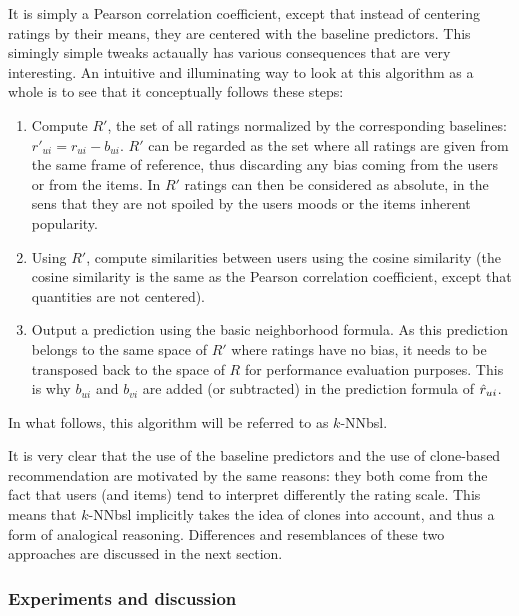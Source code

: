 It is simply a Pearson correlation coefficient, except that instead of
centering ratings by their means, they are centered with the baseline
predictors. This simingly simple tweaks actaually has various consequences that
are very interesting. An intuitive and illuminating way to look at this
algorithm as a whole is to see that it conceptually follows these steps:
\begin{enumerate}
  \item Compute $R'$, the set of all ratings normalized by the corresponding
    baselines: $r'_{ui} = r_{ui} - b_{ui}$.  $R'$ can be regarded as the set
    where all ratings are given from the same frame of reference, thus
    discarding any bias coming from the users or from the items. In $R'$
    ratings can then be considered as absolute, in the sens that they are not
    spoiled by the users moods or the items inherent popularity.
  \item Using $R'$, compute similarities between users using the cosine
    similarity (the cosine similarity is the same as the Pearson correlation
    coefficient, except that quantities are not centered).
  \item Output a prediction using the basic neighborhood formula. As this
    prediction belongs to the same space of $R'$ where ratings have no bias, it
    needs to be transposed back to the space of $R$ for performance evaluation
    purposes. This is why $b_{ui}$ and $b_{vi}$ are added (or subtracted) in
    the prediction formula of $\hat{r}_{ui}$.
\end{enumerate}

In what follows, this algorithm will be referred to as $k$-NNbsl.

It is very clear that the use of the baseline predictors and the use of
clone-based recommendation are motivated by the same reasons: they both come
from the fact that users (and items) tend to interpret differently the rating
scale.  This means that $k$-NNbsl implicitly takes the idea of clones into
account, and thus a form of analogical reasoning.  Differences and resemblances
of these two approaches are discussed in the next section.

\subsubsection{Experiments and discussion}
\label{expeDiscuss}

